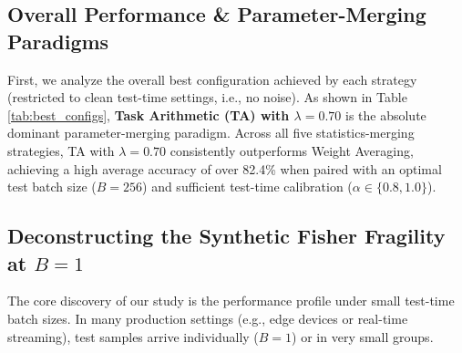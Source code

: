 \documentclass{article}
\theoremstyle{plain}
\theoremstyle{definition}
\theoremstyle{remark}
\begin{document}
\subsection{Overall Performance \& Parameter-Merging Paradigms}
First, we analyze the overall best configuration achieved by each strategy (restricted to clean test-time settings, i.e., no noise). As shown in Table \ref{tab:best_configs}, \textbf{Task Arithmetic (TA) with $\lambda = 0.70$} is the absolute dominant parameter-merging paradigm. Across all five statistics-merging strategies, TA with $\lambda=0.70$ consistently outperforms Weight Averaging, achieving a high average accuracy of over 82.4\% when paired with an optimal test batch size ($B=256$) and sufficient test-time calibration ($\alpha \in \{0.8, 1.0\}$).

\begin{table}[t]
\caption{Overall best configurations achieved by each statistics-merging strategy (no test-time noise).}
\label{tab:best_configs}
\begin{center}
\begin{small}
\end{small}
\end{center}
\end{table}

\subsection{Deconstructing the Synthetic Fisher Fragility at $B=1$}
The core discovery of our study is the performance profile under small test-time batch sizes. In many production settings (e.g., edge devices or real-time streaming), test samples arrive individually ($B=1$) or in very small groups.
\end{document}
